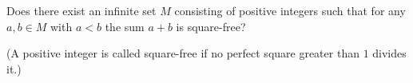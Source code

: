Does there exist an infinite set \(M\) consisting of positive integers such that for any \(a,b\in M\) with \(a<b\) the sum \(a+b\) is square-free?

(A positive integer is called square-free if no perfect square greater than \(1\) divides it.)

